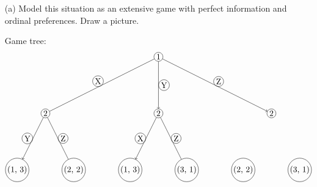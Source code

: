 \documentclass[11pt]{article}
\begin{document}
\begin{enumerate}
    \item[(a)] Model this situation as an extensive game with perfect information and ordinal preferences. Draw a picture.
    \begin{solution}
    Game tree:
    \[
        \begin{tikzpicture}[scale=1.2, every node/.style={draw, circle, inner sep=1pt}]
        \node (A) at (0,0) {1};
        
        \node (B) at (-4,-2) {2};
        \node (C) at (0,-2) {2};
        \node (D) at (4, -2) {2};
        
        \node (E) at (-5,-4) {(1, 3)};
        \node (F) at (-3,-4) {(2, 2)};

        \node (G) at (-1,-4) {(1, 3)};
        \node (H) at (1,-4) {(3, 1)};

        \node (I) at (3,-4) {(2, 2)};
        \node (J) at (5,-4) {(3, 1)};

        \draw (A) -- (B) node[midway, above left] {X};
        \draw (A) -- (C)[->] node[midway, right] {Y};
        \draw (A) -- (D)[->] node[midway, above right] {Z};

        \draw (B) -- (E)[->] node[midway, left] {Y};
        \draw (B) -- (F) node[midway, right] {Z};

        \draw (C) -- (G)[->] node[midway, left] {X};
        \draw (C) -- (H) node[midway, right] {Z};


\end{tikzpicture}\]
\end{solution}
\end{enumerate}
\end{document}

